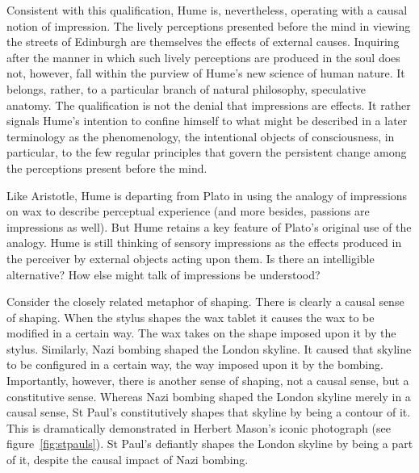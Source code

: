Consistent with this qualification, Hume is, nevertheless, operating with a causal notion of impression. The lively perceptions presented before the mind in viewing the streets of Edinburgh are themselves the effects of external causes. Inquiring after the manner in which such lively perceptions are produced in the soul does not, however, fall within the purview of Hume's new science of human nature. It belongs, rather, to a particular branch of natural philosophy, speculative anatomy. The qualification is not the denial that impressions are effects. It rather signals Hume's intention to confine himself to what might be described in a later terminology as the phenomenology, the intentional objects of consciousness, in particular, to the few regular principles that govern the persistent change among the perceptions present before the mind.

Like Aristotle, Hume is departing from Plato in using the analogy of impressions on wax to describe perceptual experience (and more besides, passions are impressions as well). But Hume retains a key feature of Plato's original use of the analogy. Hume is still thinking of sensory impressions as the effects produced in the perceiver by external objects acting upon them. Is there an intelligible alternative? How else might talk of impressions be understood? 

Consider the closely related metaphor of shaping. There is clearly a causal sense of shaping. When the stylus shapes the wax tablet it causes the wax to be modified in a certain way. The wax takes on the shape imposed upon it by the stylus. Similarly, Nazi bombing shaped the London skyline. It caused that skyline to be configured in a certain way, the way imposed upon it by the bombing. Importantly, however, there is another sense of shaping, not a causal sense, but a constitutive sense. Whereas Nazi bombing shaped the London skyline merely in a causal sense, St Paul's constitutively shapes that skyline by being a contour of it. This is dramatically demonstrated in Herbert Mason's iconic photograph (see figure~\ref{fig:stpauls}). St Paul's defiantly shapes the London skyline by being a part of it, despite the causal impact of Nazi bombing.

